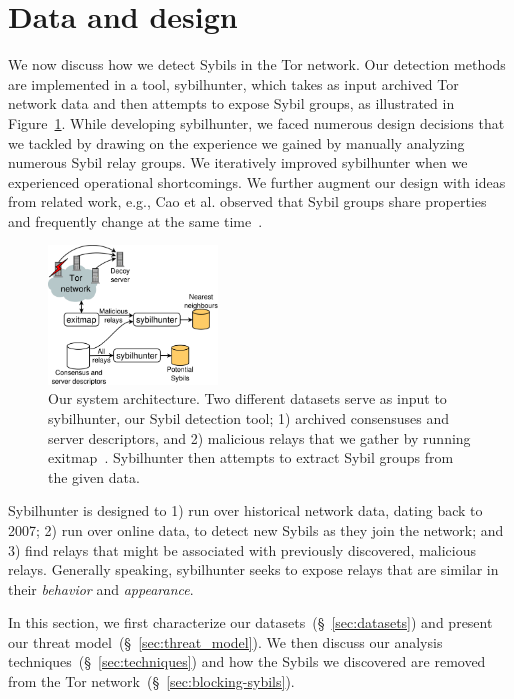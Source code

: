 \section{Data and design}
\label{sec:design}
We now discuss how we detect Sybils in the Tor network.  Our detection methods
are implemented in a tool, sybilhunter, which takes as input archived Tor
network data and then attempts to expose Sybil groups, as illustrated in
Figure~\ref{fig:system}.  While developing sybilhunter, we faced numerous design
decisions that we tackled by drawing on the experience we gained by manually
analyzing numerous Sybil relay groups.  We iteratively improved sybilhunter when
we experienced operational shortcomings.  We further augment our design with
ideas from related work, e.g., Cao et al. observed that Sybil groups share
properties and frequently change at the same time~\cite{Cao2014a}.

\begin{figure}[t]
	\centering
	\includegraphics[width=0.4\textwidth]{diagrams/system_architecture.pdf}
	\caption{Our system architecture.  Two different datasets serve as input
		to sybilhunter, our Sybil detection tool; 1) archived consensuses and
		server descriptors, and 2) malicious relays that we gather by running
		exitmap~\cite{Winter2014a}.  Sybilhunter then attempts to extract Sybil
		groups from the given data.}
	\label{fig:system}
\end{figure}

Sybilhunter is designed to 1) run over historical network data, dating back to
2007; 2) run over online data, to detect new Sybils as they join the network;
and 3) find relays that might be associated with previously discovered,
malicious relays.  Generally speaking, sybilhunter seeks to expose relays that
are similar in their \emph{behavior} and \emph{appearance}.

In this section, we first characterize our datasets~(\S~\ref{sec:datasets}) and
present our threat model~(\S~\ref{sec:threat_model}).  We then discuss our
analysis techniques~(\S~\ref{sec:techniques}) and how the Sybils we
discovered are removed from the Tor network~(\S~\ref{sec:blocking-sybils}).

